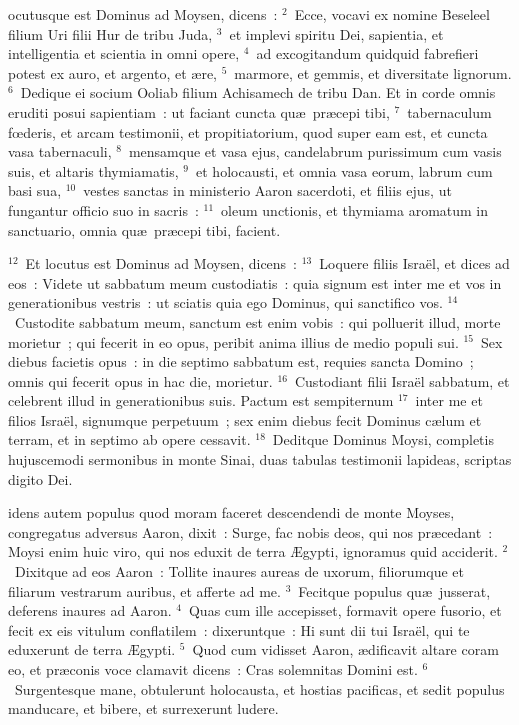 \bchapter
{}ocutusque est Dominus ad Moysen, dicens~:
${}^{2}$~Ecce, vocavi ex nomine Beseleel filium Uri filii Hur de tribu Juda,
${}^{3}$~et implevi spiritu Dei, sapientia, et intelligentia et scientia in omni opere,
${}^{4}$~ad excogitandum quidquid fabrefieri potest ex auro, et argento, et \ae re,
${}^{5}$~marmore, et gemmis, et diversitate lignorum.
${}^{6}$~Dedique ei socium Ooliab filium Achisamech de tribu Dan. Et in corde omnis eruditi posui sapientiam~: ut faciant cuncta qu\ae\ pr\ae cepi tibi,
${}^{7}$~tabernaculum fœderis, et arcam testimonii, et propitiatorium, quod super eam est, et cuncta vasa tabernaculi,
${}^{8}$~mensamque et vasa ejus, candelabrum purissimum cum vasis suis, et altaris thymiamatis,
${}^{9}$~et holocausti, et omnia vasa eorum, labrum cum basi sua,
${}^{10}$~vestes sanctas in ministerio Aaron sacerdoti, et filiis ejus, ut fungantur officio suo in sacris~:
${}^{11}$~oleum unctionis, et thymiama aromatum in sanctuario, omnia qu\ae\ pr\ae cepi tibi, facient.


${}^{12}$~Et locutus est Dominus ad Moysen, dicens~:
${}^{13}$~Loquere filiis Isra\"el, et dices ad eos~: Videte ut sabbatum meum custodiatis~: quia signum est inter me et vos in generationibus vestris~: ut sciatis quia ego Dominus, qui sanctifico vos.
${}^{14}$~Custodite sabbatum meum, sanctum est enim vobis~: qui polluerit illud, morte morietur~; qui fecerit in eo opus, peribit anima illius de medio populi sui.
${}^{15}$~Sex diebus facietis opus~: in die septimo sabbatum est, requies sancta Domino~; omnis qui fecerit opus in hac die, morietur.
${}^{16}$~Custodiant filii Isra\"el sabbatum, et celebrent illud in generationibus suis. Pactum est sempiternum
${}^{17}$~inter me et filios Isra\"el, signumque perpetuum~; sex enim diebus fecit Dominus c\ae lum et terram, et in septimo ab opere cessavit.
${}^{18}$~Deditque Dominus Moysi, completis hujuscemodi sermonibus in monte Sinai, duas tabulas testimonii lapideas, scriptas digito Dei.

\bchapter
{}idens autem populus quod moram faceret descendendi de monte Moyses, congregatus adversus Aaron, dixit~: Surge, fac nobis deos, qui nos pr\ae cedant~: Moysi enim huic viro, qui nos eduxit de terra \AE gypti, ignoramus quid acciderit.
${}^{2}$~Dixitque ad eos Aaron~: Tollite inaures aureas de uxorum, filiorumque et filiarum vestrarum auribus, et afferte ad me.
${}^{3}$~Fecitque populus qu\ae\ jusserat, deferens inaures ad Aaron.
${}^{4}$~Quas cum ille accepisset, formavit opere fusorio, et fecit ex eis vitulum conflatilem~: dixeruntque~: Hi sunt dii tui Isra\"el, qui te eduxerunt de terra \AE gypti.
${}^{5}$~Quod cum vidisset Aaron, \ae dificavit altare coram eo, et pr\ae conis voce clamavit dicens~: Cras solemnitas Domini est.
${}^{6}$~Surgentesque mane, obtulerunt holocausta, et hostias pacificas, et sedit populus manducare, et bibere, et surrexerunt ludere.


